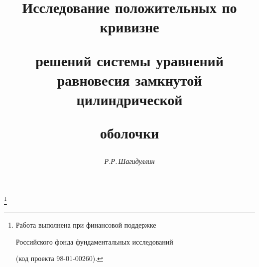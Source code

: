 








\newcommand{\tts}[1]{}







\setcounter{page}{85}















\author{\it Р.Р.\,Шагидуллин}




\title{Исследование положительных по кривизне


решений системы уравнений равновесия замкнутой цилиндрической


оболочки}


\thanks{Работа выполнена при финансовой поддержке


Российского фонда фундаментальных исследований


(код проекта 98-01-00260).}





\date{}




\pagestyle{plain} %







\maketitle


